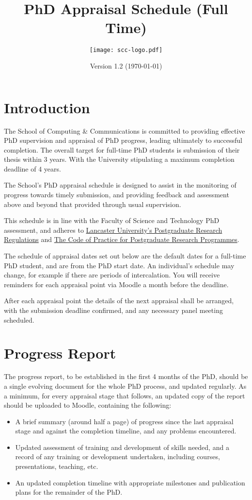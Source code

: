 \documentclass[12pt,a4paper]{article}
\title{PhD Appraisal Schedule (Full Time)}
\author{\texttt{[image: scc-logo.pdf]}}
\date{Version 1.2 (\today)}
\begin{document}
\maketitle

\section{Introduction}
The School of Computing \& Communications is committed to providing effective PhD supervision and appraisal of PhD progress, leading ultimately to successful completion. The overall target for full-time PhD students is submission of their thesis within 3 years. With the University stipulating a maximum completion deadline of 4 years.

The School's PhD appraisal schedule is designed to assist in the monitoring of progress towards timely submission, and providing feedback and assessment above and beyond that provided through usual supervision.

This schedule is in line with the Faculty of Science and Technology PhD assessment, and adheres to
\href{https://gap.lancs.ac.uk/ASQ/QAE/MARP/Documents/PGR-Regs.pdf}{Lancaster University's Postgraduate Research Regulations} and 
\href{https://gap.lancs.ac.uk/ASQ/Policies/Documents/Postgraduate-Research-Code-of-Practice.pdf}{The Code of Practice for Postgraduate Research Programmes}.

The schedule of appraisal dates set out below are the default dates for a full-time PhD student, and are from the PhD start date. An individual's schedule may change, for example if there are periods of intercalation. You will receive reminders for each appraisal point via Moodle a month before the deadline.

After each appraisal point the details of the next appraisal shall be arranged, with the submission deadline confirmed, and any necessary panel meeting scheduled.

\section{Progress Report}
The progress report, to be established in the first 4 months of the PhD, should be a single evolving document for the whole PhD process, and updated regularly. As a minimum, for every appraisal stage that follows, an updated copy of the report should be uploaded to Moodle, containing the following:
\begin{itemize}
	\item A brief summary (around half a page) of progress since the last appraisal stage and against the completion timeline, and any problems encountered.
	\item Updated assessment of training and development of skills needed, and a record of any training or development undertaken, including courses, presentations, teaching, etc.\
	\item An updated completion timeline with appropriate milestones and publication plans for the remainder of the PhD.
\end{itemize}
\end{document}

